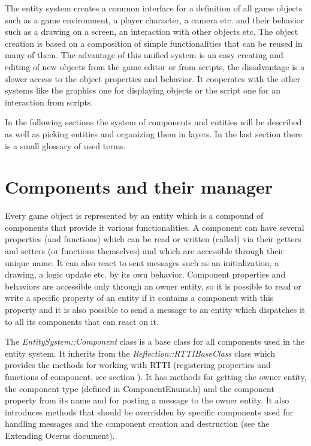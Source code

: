 \documentclass[a4paper, 12pt]{report}
\begin{document}
The entity system creates a common interface for a definition of all game objects such as a game environment, a player character, a camera etc. and their behavior such as a drawing on a screen, an interaction with other objects etc. The object creation is based on a composition of simple functionalities that can be reused in many of them. The advantage of this unified system is an easy creating and editing of new objects from the game editor or from scripts, the disadvantage is a slower access to the object properties and behavior. It cooperates with the other systems like the graphics one for displaying objects or the script one for an interaction from scripts.

In the following sections the system of components and entities will be described as well as picking entities and organizing them in layers. In the last section there is a small glossary of used terms.

\section{Components and their manager}

Every game object is represented by an entity which is a compound of components that provide it various functionalities. A component can have several properties (and functions) which can be read or written (called) via their getters and setters (or functions themselves) and which are accessible through their unique name. It can also react to sent messages such as an initialization, a drawing, a logic update etc. by its own behavior. Component properties and behaviors are accessible only through an owner entity, so it is possible to read or write a specific property of an entity if it contains a component with this property and it is also possible to send a message to an entity which dispatches it to all its components that can react on it.

The \emph{EntitySystem::Component} class is a base class for all components used in the entity system. It inherits from the \emph{Reflection::RTTIBaseClass} class which provides the methods for working with RTTI (registering properties and functions of component, see section 
).
It has methods for getting the owner entity, the component type (defined in ComponentEnums.h) and the component property from its name and for posting a message to the owner entity. It also introduces methods that should be overridden by specific components used for handling messages and the component creation and destruction (see the Extending Ocerus document).
\end{document}
